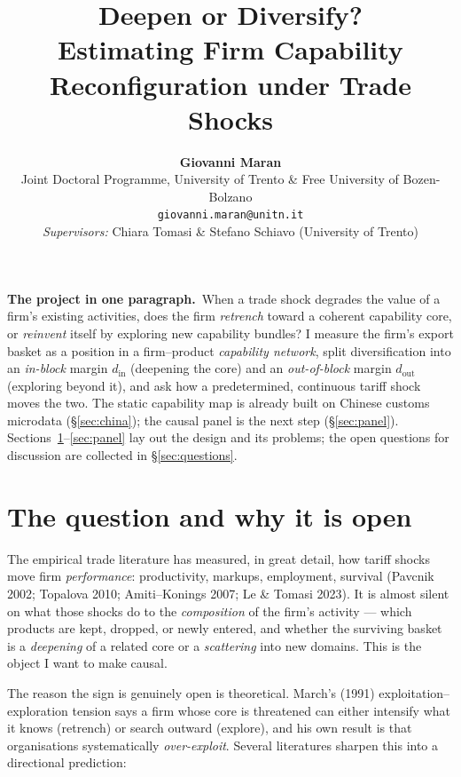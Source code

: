 \documentclass[11pt]{article}
\title{\vspace{-1.0cm}\textbf{\large Deepen or Diversify?}\\[4pt]
\Large Estimating Firm Capability Reconfiguration under Trade Shocks}
\author{%
\textbf{Giovanni Maran}\\[3pt]
\small Joint Doctoral Programme, University of Trento \& Free University of Bozen-Bolzano\\
\small\texttt{giovanni.maran@unitn.it}\\[6pt]
\small \emph{Supervisors:} Chiara Tomasi \& Stefano Schiavo (University of Trento)}
\date{}
\newcommand{\din}{d_{\mathrm{in}}}
\newcommand{\dout}{d_{\mathrm{out}}}
\begin{document}
\maketitle
\thispagestyle{empty}

\begin{keybox}
\noindent\textbf{The project in one paragraph.}\ When a trade shock degrades the value
of a firm's existing activities, does the firm \emph{retrench} toward a coherent
capability core, or \emph{reinvent} itself by exploring new capability bundles? I
measure the firm's export basket as a position in a firm--product \emph{capability
network}, split diversification into an \emph{in-block} margin $\din$ (deepening the
core) and an \emph{out-of-block} margin $\dout$ (exploring beyond it), and ask how a
predetermined, continuous tariff shock moves the two. The static capability map is
already built on Chinese customs microdata (\S\ref{sec:china}); the causal panel is the
next step (\S\ref{sec:panel}). Sections~\ref{sec:question}--\ref{sec:panel} lay out the
design and its problems; the open questions for discussion are collected in
\S\ref{sec:questions}.
\end{keybox}

\vspace{2pt}
{\small\tableofcontents}
\bigskip

\section{The question and why it is open}
\label{sec:question}

The empirical trade literature has measured, in great detail, how tariff shocks move
firm \emph{performance}: productivity, markups, employment, survival
(Pavcnik 2002; Topalova 2010; Amiti--Konings 2007; Le \& Tomasi 2023). It is almost
silent on what those shocks do to the \emph{composition} of the firm's activity --- which
products are kept, dropped, or newly entered, and whether the surviving basket is a
\emph{deepening} of a related core or a \emph{scattering} into new domains. This is the
object I want to make causal.

The reason the sign is genuinely open is theoretical. March's (1991)
exploitation--exploration tension says a firm whose core is threatened can either
intensify what it knows (retrench) or search outward (explore), and his own result is
that organisations systematically \emph{over-exploit}. Several literatures sharpen this
into a directional prediction:
\end{document}
